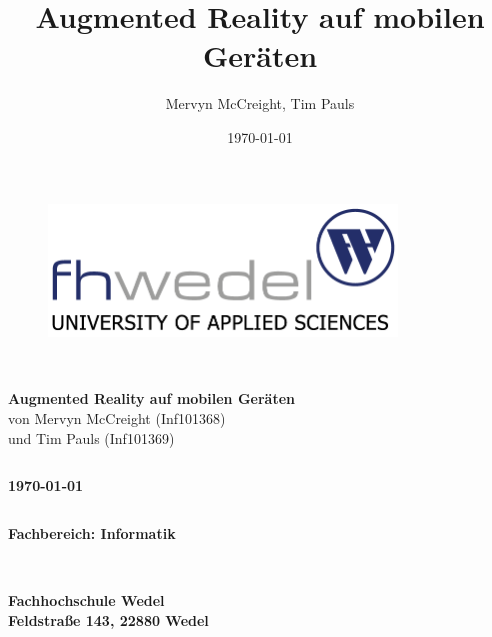 \documentclass[a4paper, 12pt, hidelinks]{report}
\title{Augmented Reality auf mobilen Geräten}
\author{Mervyn McCreight, Tim Pauls}
\date{\today}
\begin{document}


\begin{figure}[h]
\centering
\includegraphics[width=350px]{fhwedel}
\label{fig:fhwedel}
\end{figure}




\begin{verbatim}


\end{verbatim}

\begin{center}
\textbf{\LARGE{Augmented Reality auf mobilen Geräten}}\\
von Mervyn McCreight (Inf101368)\\
und Tim Pauls (Inf101369)

\end{center}

\begin{verbatim}
\end{verbatim}

\begin{center}
\textbf{\today}
\end{center}

\begin{verbatim}
\end{verbatim}

\begin{center}
\textbf{\large{Fachbereich: Informatik}}
\end{center}

\begin{verbatim}


\end{verbatim}

\begin{center}
\textbf{\large{Fachhochschule Wedel}} \\
\textbf{\large{Feldstraße 143, 22880 Wedel}} \\
\end{center}
\end{document}
